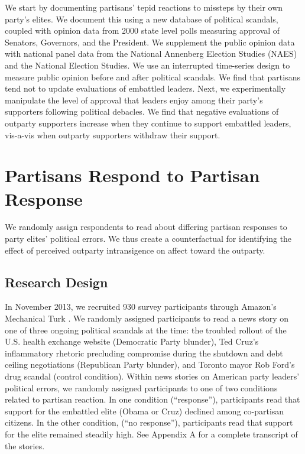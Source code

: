 \documentclass[12pt]{article}
\begin{document}
We start by documenting partisans' tepid reactions to missteps by their own
party's elites. We document this using a new database of political scandals, coupled with opinion data from 2000 state level polls measuring approval of Senators, Governors, and the President. We supplement the public opinion data with national panel data from the National Annenberg Election Studies (NAES) and the National Election Studies. We use an interrupted time-series design to measure public opinion before and after political scandals. We find that partisans tend not to update evaluations of embattled leaders. Next, we experimentally manipulate the level of approval that leaders enjoy among their party's supporters following political debacles. We find that negative evaluations of outparty supporters increase when they continue to support embattled leaders, vis-a-vis when outparty supporters withdraw their support.

\section*{Partisans Respond to Partisan Response}
We randomly assign respondents to read about differing partisan responses to party elites' political errors. We thus create a counterfactual for identifying the effect of perceived outparty intransigence on affect toward the outparty.

\subsection*{Research Design}
In November 2013, we recruited 930 survey participants through Amazon's
Mechanical Turk \citep[see][]{BerinskyHuberLenz2012}. We randomly assigned participants to read a news story on one of three ongoing political scandals at the time: the troubled rollout of the U.S. health exchange website (Democratic Party blunder), Ted Cruz's inflammatory rhetoric precluding compromise during the shutdown and debt ceiling negotiations (Republican Party blunder), and Toronto mayor Rob Ford's drug scandal (control condition). Within news stories on American party leaders' political errors, we randomly assigned participants to one of two conditions related to partisan reaction. In one condition (``response''), participants read that support for the embattled elite (Obama or Cruz) declined among co-partisan citizens. In the other condition, (``no response''), participants read that support for the elite remained steadily high. See Appendix A for a complete transcript of the stories.
\end{document}

